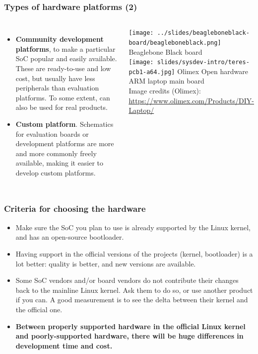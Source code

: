 \begin{frame}
  \frametitle{Types of hardware platforms (2)}
  \begin{columns}
  \begin{itemize}
  \item {\bf Community development platforms}, to make a
    particular SoC popular and easily available. These are
    ready-to-use and low cost, but usually have less peripherals than
    evaluation platforms. To some extent, can also be used for real
    products.
  \item {\bf Custom platform}. Schematics for evaluation boards or
    development platforms are more and more commonly freely available,
    making it easier to develop custom platforms.
  \end{itemize}
    \texttt{[image: ../slides/beagleboneblack-board/beagleboneblack.png]}
    \scriptsize
    Beaglebone Black board\\
    \vspace{0.5cm}
    \texttt{[image: slides/sysdev-intro/teres-pcb1-a64.jpg]}
    \scriptsize
    Olimex Open hardware ARM laptop main board\\
    \tiny
    Image credits (Olimex):\\
    \url{https://www.olimex.com/Products/DIY-Laptop/}
  \end{columns}
\end{frame}

\begin{frame}
  \frametitle{Criteria for choosing the hardware}
  \begin{itemize}
  \item Make sure the SoC you plan to use is already supported by
    the Linux kernel, and has an open-source bootloader.
  \item Having support in the official versions of the projects
    (kernel, bootloader) is a lot better: quality is better, and new
    versions are available.
  \item Some SoC vendors and/or board vendors do not contribute their
    changes back to the mainline Linux kernel. Ask them to do so, or
    use another product if you can. A good measurement is to see the
    delta between their kernel and the official one.
  \item {\bf Between properly supported hardware in the official Linux
      kernel and poorly-supported hardware, there will be huge
      differences in development time and cost.}
  \end{itemize}
\end{frame}

